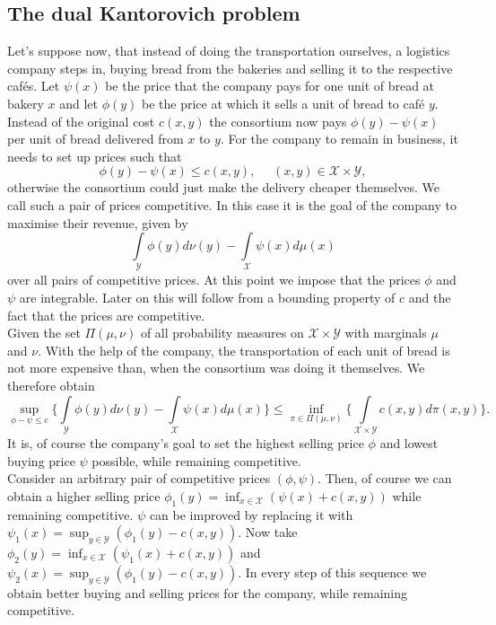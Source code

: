 \documentclass[11pt,a4paper]{article}
\begin{document}
\subsection{The dual Kantorovich problem}
Let's suppose now, that instead of doing the transportation ourselves, a logistics company steps in, buying bread from the bakeries and selling it to the respective cafés. Let $\psi(x)$ be the price that the company pays for one unit of bread at bakery $x$ and let $\phi(y)$ be the price at which it sells a unit of bread to café $y$. Instead of the original cost $c(x,y)$ the consortium now pays $\phi(y)-\psi(x)$ per unit of bread delivered from $x$ to $y$.
For the company to remain in business, it needs to set up prices such that 
\[
\phi(y)-\psi(x)\leq{}c(x,y),\,\,\quad(x,y)\in\mathcal{X\times{}Y},
\]
otherwise the consortium could just make the delivery cheaper themselves. We call such a pair of prices competitive. In this case it is the goal of the company to maximise their revenue, given by
\[
\int\limits_{\mathcal{Y}}\phi(y)d\nu(y) - \int\limits_{\mathcal{X}}\psi(x)d\mu(x)
\]
over all pairs of competitive prices. At this point we impose that the prices $\phi$ and $\psi$ are integrable. Later on this will follow from a bounding property of $c$ and the fact that the prices are competitive.\vspace{1em}\\
Given the set $\Pi(\mu,\nu)$ of all probability measures on $\mathcal{X\times{}Y}$ with marginals $\mu$ and $\nu$. With the help of the company, the transportation of each unit of bread is not more expensive than, when the consortium was doing it themselves. We therefore obtain
\[
\sup\limits_{\phi-\psi\leq{}c}\Bigg\lbrace\int\limits_{\mathcal{Y}}\phi(y)d\nu(y) - \int\limits_{\mathcal{X}}\psi(x)d\mu(x)\Bigg\rbrace \leq \inf\limits_{\pi\in\Pi(\mu,\nu)}\Bigg\lbrace\int\limits_{\mathcal{X\times{}Y}}c(x,y)d\pi(x,y)\Bigg\rbrace.
\]
It is, of course the company's goal to set the highest selling price $\phi$ and lowest buying price $\psi$ possible, while remaining competitive.\\
Consider an arbitrary pair of competitive prices $(\phi,\psi)$. Then, of course we can obtain a higher selling price $\phi_1(y) = \inf_{x\in\mathcal{X}}\left(\psi(x)+c(x,y)\right)$ while remaining competitive. $\psi$ can be improved by replacing it with $\psi_1(x) = \sup_{y\in\mathcal{Y}}\left(\phi_1(y)-c(x,y)\right)$.
Now take $\phi_2(y) = \inf_{x\in\mathcal{X}}\left(\psi_1(x)+c(x,y)\right)$ and $\psi_2(x) = \sup_{y\in\mathcal{Y}}\left(\phi_1(y)-c(x,y)\right)$. In every step of this sequence we obtain better buying and selling prices for the company, while remaining competitive. 
\end{document}
